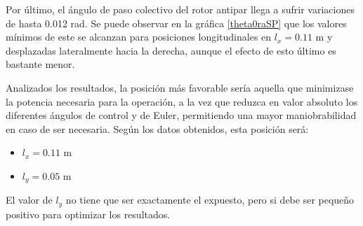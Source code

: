 Por último, el ángulo de paso colectivo del rotor antipar llega a sufrir variaciones de hasta 0.012 rad. Se puede observar en la gráfica \ref{theta0raSP} que los valores mínimos de este se alcanzan para posiciones longitudinales en $l_x=0.11$ m y desplazadas lateralmente hacia la derecha, aunque el efecto de esto último es bastante menor.

Analizados los resultados, la posición más favorable sería aquella que minimizase la potencia necesaria para la operación, a la vez que reduzca en valor absoluto los diferentes ángulos de control y de Euler, permitiendo una mayor maniobrabilidad en caso de ser necesaria.
Según los datos obtenidos, esta posición será:
\begin{itemize}
	\item $l_x=0.11$ m
	\item $l_y=0.05$ m
\end{itemize}
El valor de $l_y$ no tiene que ser exactamente el expuesto, pero si debe ser pequeño positivo para optimizar los resultados.
